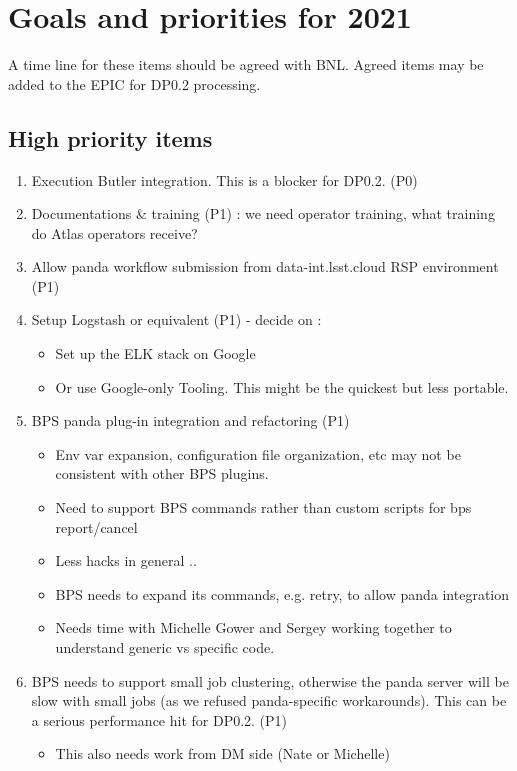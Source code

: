 \section{Goals and priorities for 2021}\label{sec:goals21}
A time line for these items should be agreed with BNL.
Agreed items  may be added to  the EPIC for DP0.2 processing.

\subsection {High priority items } \label{sec:high}
\begin{enumerate}
\item Execution Butler integration. This is a blocker for DP0.2. (P0)
\item Documentations \& training (P1) : we need operator training,  what training do Atlas operators receive?
\item Allow panda workflow submission from data-int.lsst.cloud RSP environment (P1)
\item Setup Logstash or equivalent (P1) - decide on :
\begin{itemize}
\item Set up the ELK stack on Google
\item Or use Google-only Tooling. This might be the quickest but less portable.
\end{itemize}
\item BPS panda plug-in integration and refactoring (P1)
\begin{itemize}
\item Env var expansion, configuration file organization, etc may not be consistent with other BPS plugins.
\item Need to support BPS commands rather than custom scripts for bps report/cancel
\item Less hacks in general ..
\item BPS needs to expand its commands, e.g. retry, to allow panda integration
\item Needs time with Michelle Gower and Sergey working together to understand generic vs specific code.
\end{itemize}
\item BPS needs to support small job clustering, otherwise the panda server will be slow with small jobs (as we refused panda-specific workarounds). This can be a serious performance hit for DP0.2. (P1)
\begin{itemize}
\item This also needs work from DM side (Nate or Michelle)
\end{itemize}

\end{enumerate}

